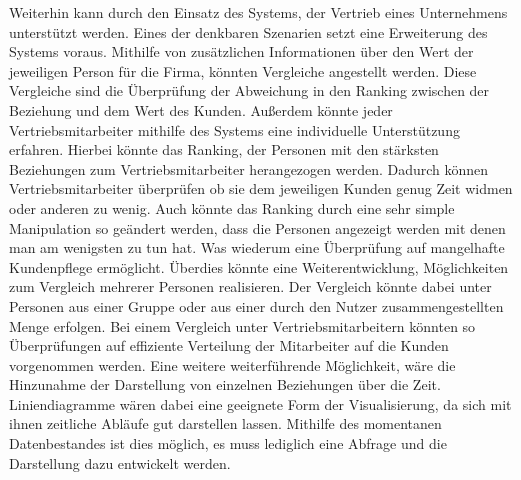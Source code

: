 Weiterhin kann durch den Einsatz des Systems, der Vertrieb eines Unternehmens unterstützt werden. Eines der denkbaren Szenarien setzt eine Erweiterung des Systems voraus. Mithilfe von zusätzlichen Informationen über den Wert der jeweiligen Person für die Firma, könnten Vergleiche angestellt werden. Diese Vergleiche sind die Überprüfung der Abweichung in den Ranking zwischen der Beziehung und dem Wert des Kunden.
Außerdem könnte jeder Vertriebsmitarbeiter mithilfe des Systems eine individuelle Unterstützung erfahren. Hierbei könnte das Ranking, der Personen mit den stärksten Beziehungen zum Vertriebsmitarbeiter herangezogen werden. Dadurch können Vertriebsmitarbeiter überprüfen ob sie dem jeweiligen Kunden genug Zeit widmen oder anderen zu wenig. Auch könnte das Ranking durch eine sehr simple Manipulation so geändert werden, dass die Personen angezeigt werden mit denen man am wenigsten zu tun hat. Was wiederum eine Überprüfung auf mangelhafte Kundenpflege ermöglicht. 
Überdies könnte eine Weiterentwicklung, Möglichkeiten zum Vergleich mehrerer Personen realisieren. Der Vergleich könnte dabei unter Personen aus einer Gruppe oder aus einer durch den Nutzer zusammengestellten Menge erfolgen. Bei einem Vergleich unter Vertriebsmitarbeitern könnten so Überprüfungen auf effiziente Verteilung der Mitarbeiter auf die Kunden vorgenommen werden.
Eine weitere weiterführende Möglichkeit, wäre die Hinzunahme der Darstellung von einzelnen Beziehungen über die Zeit. Liniendiagramme wären dabei eine geeignete Form der Visualisierung, da sich mit ihnen zeitliche Abläufe gut darstellen lassen. Mithilfe des momentanen Datenbestandes ist dies möglich, es muss lediglich eine Abfrage und die Darstellung dazu entwickelt werden.  
